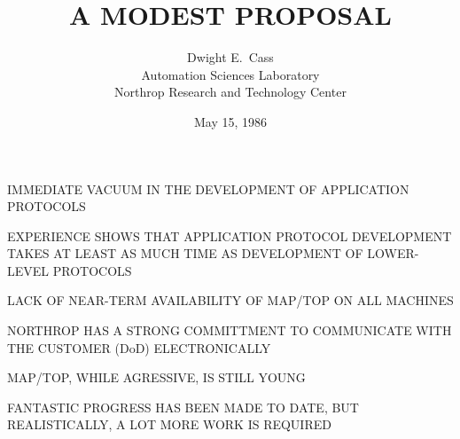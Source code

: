 


\raggedright



\title	{A MODEST PROPOSAL}
\author	{Dwight E.~Cass\\
	Automation Sciences Laboratory\\
	Northrop Research and Technology Center}
\date	{May 15, 1986}
\maketitlepage


\begin{bwslide}

\begin{nrtc}
\item	IMMEDIATE VACUUM IN THE DEVELOPMENT OF
	APPLICATION PROTOCOLS
    \begin{nrtc}
    \item	EXPERIENCE SHOWS THAT APPLICATION
		PROTOCOL DEVELOPMENT TAKES AT LEAST AS MUCH TIME AS
		DEVELOPMENT OF LOWER-LEVEL PROTOCOLS
    \end{nrtc}
\end{nrtc}
\end{bwslide}


\begin{bwslide}

\begin{nrtc}
\item	LACK OF NEAR-TERM AVAILABILITY OF MAP/TOP ON ALL %
	MACHINES
    \begin{nrtc}
    \item	NORTHROP HAS A STRONG COMMITTMENT
		TO COMMUNICATE WITH THE CUSTOMER (DoD) ELECTRONICALLY
    \end{nrtc}
\end{nrtc}
\end{bwslide}


\begin{bwslide}

\begin{nrtc}
\item	MAP/TOP, WHILE AGRESSIVE, IS STILL YOUNG
    \begin{nrtc}
    \item	FANTASTIC PROGRESS HAS BEEN MADE TO DATE,
		BUT REALISTICALLY, A LOT MORE WORK IS REQUIRED
    \end{nrtc}
\end{nrtc}
\end{bwslide}


